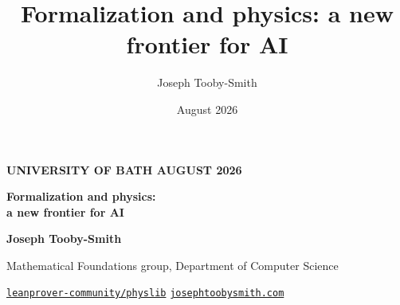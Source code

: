 \documentclass[aspectratio=169,10pt]{beamer}
\title{Formalization and physics: a new frontier for AI}
\author{Joseph Tooby-Smith}
\date{August 2026}
\begin{document}
{
\begin{frame}[plain]
  \vfill
  \begin{center}
    {\color{plsky}\footnotesize\bfseries UNIVERSITY OF BATH \;\textbullet\; AUGUST 2026}

    \vspace{0.55cm}

    {\color{white}\fontsize{27}{31}\selectfont\bfseries
      Formalization and physics:\\[1pt]
      a new frontier for AI\par}

    \vspace{0.45cm}


    \vspace{0.45cm}

    {\color{white}\Large\bfseries Joseph Tooby-Smith\par}
    \vspace{3pt}
    {\color{plsky!30!white}\small Mathematical Foundations group,
      Department of Computer Science\par}

    \vspace{0.55cm}

    {\color{white!80}\footnotesize
      \href{https://github.com/leanprover-community/physlib}{%
        \color{white!80}\; \texttt{leanprover-community/physlib}}
      \qquad
      \href{https://josephtoobysmith.com/}{%
        \color{white!80}\; \texttt{josephtoobysmith.com}}\par}
  \end{center}
  \vfill
\end{frame}
}
\end{document}
